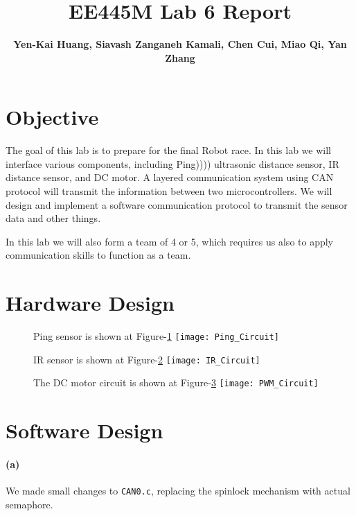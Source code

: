 \documentclass[a4paper]{article}
\newlength{\pic}
\begin{document}
\title{EE445M Lab 6 Report}
\author{\bfseries Yen-Kai Huang, Siavash Zanganeh Kamali, Chen Cui, Miao Qi, Yan Zhang}
\maketitle

\section{Objective} The goal of this lab is to prepare for the final Robot race. In this lab we will interface various
components, including Ping)))) ultrasonic distance sensor, IR distance sensor, and DC motor. A layered communication system
using CAN protocol will transmit the information between two microcontrollers. We will design and implement a software
communication protocol to transmit the sensor data and other things.

In this lab we will also form a team of 4 or 5, which requires us also to apply communication skills to function as a team.

\section{Hardware Design}
\setlength{\pic}{0.8\textwidth}
\begin{figure}[htp]
\noindent Ping sensor is shown at Figure-\ref{ping}
\center
\texttt{[image: Ping\_Circuit]}
\caption{ }
\label{ping}
\end{figure}

\setlength{\pic}{0.8\textwidth}
\begin{figure}[htp]
\noindent IR sensor is shown at Figure-\ref{ir}
\center
\texttt{[image: IR\_Circuit]}
\caption{ }
\label{ir}
\end{figure}



\setlength{\pic}{0.8\textwidth}
\begin{figure}[htp]
\noindent The DC motor circuit is shown at Figure-\ref{motor}
\center
\texttt{[image: PWM\_Circuit]}
\caption{ }
\label{motor}
\end{figure}

\section{Software Design} 

\paragraph{(a)} We made small changes to \texttt{CAN0.c}, replacing the spinlock  mechanism with actual semaphore.
\end{document}
